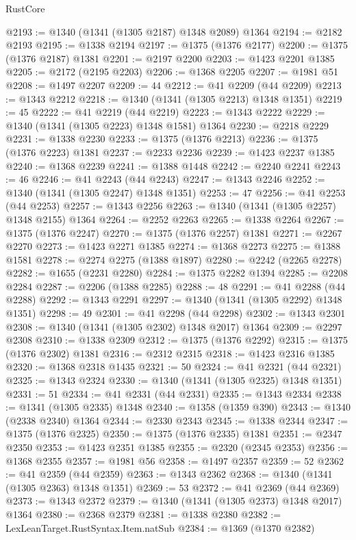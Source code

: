 \begin{lexlean}{RustCore}
\begin{coremodule}
@2193 := @1340 (@1341 (@1305 @2187) @1348 @2089) @1364
@2194 := @2182 @2193
@2195 := @1338 @2194
@2197 := @1375 (@1376 @2177)
@2200 := @1375 (@1376 @2187) @1381
@2201 := @2197 @2200
@2203 := @1423 @2201 @1385
@2205 := @2172 (@2195 @2203)
@2206 := @1368 @2205
@2207 := @1981 @51
@2208 := @1497 @2207
@2209 := 44
@2212 := @41 @2209 (@44 @2209)
@2213 := @1343 @2212
@2218 := @1340 (@1341 (@1305 @2213) @1348 @1351)
@2219 := 45
@2222 := @41 @2219 (@44 @2219)
@2223 := @1343 @2222
@2229 := @1340 (@1341 (@1305 @2223) @1348 @1581) @1364
@2230 := @2218 @2229
@2231 := @1338 @2230
@2233 := @1375 (@1376 @2213)
@2236 := @1375 (@1376 @2223) @1381
@2237 := @2233 @2236
@2239 := @1423 @2237 @1385
@2240 := @1368 @2239
@2241 := @1388 @1448
@2242 := @2240 @2241
@2243 := 46
@2246 := @41 @2243 (@44 @2243)
@2247 := @1343 @2246
@2252 := @1340 (@1341 (@1305 @2247) @1348 @1351)
@2253 := 47
@2256 := @41 @2253 (@44 @2253)
@2257 := @1343 @2256
@2263 := @1340 (@1341 (@1305 @2257) @1348 @2155) @1364
@2264 := @2252 @2263
@2265 := @1338 @2264
@2267 := @1375 (@1376 @2247)
@2270 := @1375 (@1376 @2257) @1381
@2271 := @2267 @2270
@2273 := @1423 @2271 @1385
@2274 := @1368 @2273
@2275 := @1388 @1581
@2278 := @2274 @2275 (@1388 @1897)
@2280 := @2242 (@2265 @2278)
@2282 := @1655 (@2231 @2280)
@2284 := @1375 @2282 @1394
@2285 := @2208 @2284
@2287 := @2206 (@1388 @2285)
@2288 := 48
@2291 := @41 @2288 (@44 @2288)
@2292 := @1343 @2291
@2297 := @1340 (@1341 (@1305 @2292) @1348 @1351)
@2298 := 49
@2301 := @41 @2298 (@44 @2298)
@2302 := @1343 @2301
@2308 := @1340 (@1341 (@1305 @2302) @1348 @2017) @1364
@2309 := @2297 @2308
@2310 := @1338 @2309
@2312 := @1375 (@1376 @2292)
@2315 := @1375 (@1376 @2302) @1381
@2316 := @2312 @2315
@2318 := @1423 @2316 @1385
@2320 := @1368 @2318 @1435
@2321 := 50
@2324 := @41 @2321 (@44 @2321)
@2325 := @1343 @2324
@2330 := @1340 (@1341 (@1305 @2325) @1348 @1351)
@2331 := 51
@2334 := @41 @2331 (@44 @2331)
@2335 := @1343 @2334
@2338 := @1341 (@1305 @2335) @1348
@2340 := @1358 (@1359 @390)
@2343 := @1340 (@2338 @2340) @1364
@2344 := @2330 @2343
@2345 := @1338 @2344
@2347 := @1375 (@1376 @2325)
@2350 := @1375 (@1376 @2335) @1381
@2351 := @2347 @2350
@2353 := @1423 @2351 @1385
@2355 := @2320 (@2345 @2353)
@2356 := @1368 @2355
@2357 := @1981 @56
@2358 := @1497 @2357
@2359 := 52
@2362 := @41 @2359 (@44 @2359)
@2363 := @1343 @2362
@2368 := @1340 (@1341 (@1305 @2363) @1348 @1351)
@2369 := 53
@2372 := @41 @2369 (@44 @2369)
@2373 := @1343 @2372
@2379 := @1340 (@1341 (@1305 @2373) @1348 @2017) @1364
@2380 := @2368 @2379
@2381 := @1338 @2380
@2382 := LexLeanTarget.RustSyntax.Item.natSub
@2384 := @1369 (@1370 @2382)

\end{coremodule}
\end{lexlean}
